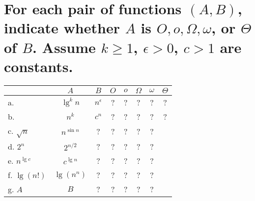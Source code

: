 \section[Problem 5]{For each pair of functions $(A, B)$, indicate whether $A$ is $O, o, \Omega, \omega$, or $\Theta$ of $B$. Assume $k \geq 1$, $\epsilon > 0$, $c > 1$ are constants.}
\begin{center}
	\begin{tabular}{lcc|c|c|c|c|c}
		& $A$ & $B$ & $O$ & $o$ & $\Omega$ & $\omega$ & $\Theta$ \\ \hline
		a. & $\lg^k n$ & $n^{\epsilon}$ & ? & ? & ? & ? & ? \\ \hline
		b. & $n^k$ & $c^n$ & ? & ? & ? & ? & ? \\ \hline
		c. $\sqrt{n}$ & $n^{\sin n}$ & ? & ? & ? & ? & ? \\ \hline
		d. $2^n$ & $2^{n/2}$ & ? & ? & ? & ? & ? \\ \hline
		e. $n^{\lg c}$ & $c^{\lg n}$ & ? & ? & ? & ? & ? \\ \hline
		f. $\lg(n!)$ & $\lg(n^n)$ & ? & ? & ? & ? & ? \\ \hline
		g. $A$ & $B$ & ? & ? & ? & ? & ?
	\end{tabular}
\end{center}


